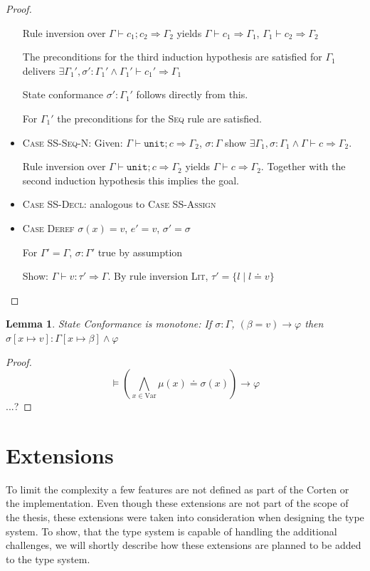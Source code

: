 \documentclass{book}
\newcommand{\code}[1]{\texttt{#1}}
\newtheorem{lemma}[theorem]{Lemma}
\theoremstyle{definition}
\begin{document}
\begin{proof}
\begin{itemize}
    Rule inversion over $\Gamma \vdash c_1 ; c_2 \Rightarrow \Gamma_2$ yields $\Gamma \vdash c_1 \Rightarrow \Gamma_1$, $\Gamma_1 \vdash c_2 \Rightarrow \Gamma_2$

    The preconditions for the third induction hypothesis are satisfied for $\Gamma_1$ delivers 
    $\exists \Gamma_1', \sigma' : \Gamma_1' \wedge \Gamma_1' \vdash c_1' \Rightarrow \Gamma_1$

    State conformance $\sigma' : \Gamma_1'$ follows directly from this.

    For $\Gamma_1'$ the preconditions for the \textsc{Seq} rule are satisfied.
  \item \textsc{Case SS-Seq-N}: 
    Given: $\Gamma \vdash \code{unit}; c \Rightarrow \Gamma_2$, $\sigma : \Gamma$
    show $\exists \Gamma_1, \sigma : \Gamma_1 \wedge \Gamma \vdash c \Rightarrow \Gamma_2$.

    Rule inversion over $\Gamma \vdash \code{unit}; c \Rightarrow \Gamma_2$ yields $\Gamma \vdash c \Rightarrow \Gamma_2$.
    Together with the second induction hypothesis this implies the goal.
  \item \textsc{Case SS-Decl}: analogous to \textsc{Case SS-Assign}
  \item \textsc{Case Deref}
    $\sigma(x) = v$, $e' = v$, $\sigma' = \sigma$

    For $\Gamma' = \Gamma$, $\sigma : \Gamma'$ true by assumption

    Show: $\Gamma \vdash v : \tau' \Rightarrow \Gamma$. By rule inversion \textsc{Lit}, $\tau' = \{ l \mid l \doteq v \}$
\end{itemize}
\end{proof}

\begin{lemma}
  State Conformance is monotone: If $\sigma : \Gamma$, $(\beta = v) \to \varphi$ then
    $\sigma[x \mapsto v] : \Gamma[x \mapsto \beta] \wedge \varphi$
\end{lemma}

\begin{proof}
  $$\vDash \left(\bigwedge_{x \in \text{Var}} \mu(x) \doteq \sigma(x)\right) \to \varphi$$
  ...?
\end{proof}

\label{sec:extensions} \section{Extensions}


To limit the complexity a few features are not defined as part of the Corten or the implementation.
Even though these extensions are not part of the scope of the thesis, these extensions were taken into consideration when designing the type system. To show, that the type system is capable of handling the additional challenges, we will shortly describe how these extensions are planned to be added to the type system.
\end{document}
